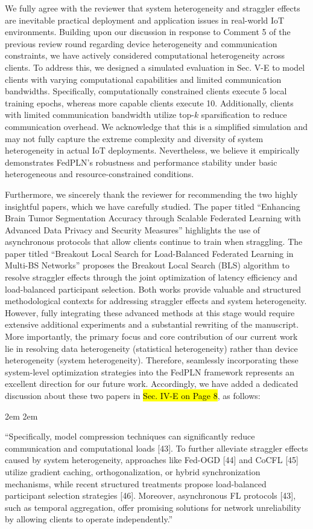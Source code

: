 \documentclass[a4paper,12pt]{article}
\newcommand{\hlb}[1]{\sethlcolor{b}\hl{#1}}
\begin{document}
We fully agree with the reviewer that system heterogeneity and straggler effects are inevitable practical deployment and application issues in real-world IoT environments.
Building upon our discussion in response to Comment 5 of the previous review round regarding device heterogeneity and communication constraints, we have actively considered computational heterogeneity across clients.
To address this, we designed a simulated evaluation in Sec. V-E to model clients with varying computational capabilities and limited communication bandwidths.
Specifically, computationally constrained clients execute 5 local training epochs, whereas more capable clients execute 10.
Additionally, clients with limited communication bandwidth utilize top-$k$ sparsification to reduce communication overhead.
We acknowledge that this is a simplified simulation and may not fully capture the extreme complexity and diversity of system heterogeneity in actual IoT deployments.
Nevertheless, we believe it empirically demonstrates FedPLN's robustness and performance stability under basic heterogeneous and resource-constrained conditions.

Furthermore, we sincerely thank the reviewer for recommending the two highly insightful papers, which we have carefully studied.
The paper titled ``Enhancing Brain Tumor Segmentation Accuracy through Scalable Federated Learning with Advanced Data Privacy and Security Measures'' highlights the use of asynchronous protocols that allow clients continue to train when straggling.
The paper titled ``Breakout Local Search for Load-Balanced Federated Learning in Multi-BS Networks'' proposes the Breakout Local Search (BLS) algorithm to resolve straggler effects through the joint optimization of latency efficiency and load-balanced participant selection.
Both works provide valuable and structured methodological contexts for addressing straggler effects and system heterogeneity.
However, fully integrating these advanced methods at this stage would require extensive additional experiments and a substantial rewriting of the manuscript.
More importantly, the primary focus and core contribution of our current work lie in resolving data heterogeneity (statistical heterogeneity) rather than device heterogeneity (system heterogeneity).
Therefore, seamlessly incorporating these system-level optimization strategies into the FedPLN framework represents an excellent direction for our future work.
Accordingly, we have added a dedicated discussion about these two papers in \hlb{Sec. IV-E on Page 8}, as follows:

\leftskip 2em
\rightskip 2em
\medskip

\noindent
``Specifically, model compression techniques can significantly reduce communication and computational loads [43].
To further alleviate straggler effects caused by system heterogeneity, approaches like Fed-OGD [44] and CoCFL [45] utilize gradient caching, orthogonalization, or hybrid synchronization mechanisms, while recent structured treatments propose load-balanced participant selection strategies [46].
Moreover, asynchronous FL protocols [43], such as temporal aggregation, offer promising solutions for network unreliability by allowing clients to operate independently.''
\end{document}
